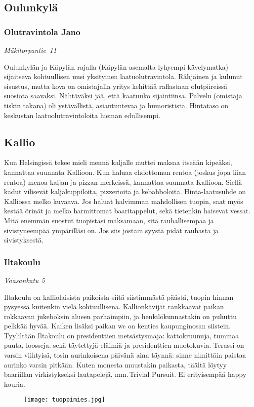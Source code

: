 \documentclass[../ala_hataile.tex]{subfiles}
\begin{document}
\subsection*{Oulunkylä}
\subsubsection*{Olutravintola Jano}
\textit{Mäkitorpantie~11}

Oulunkylän ja Käpylän rajalla (Käpylän
asemalta lyhyempi kävelymatka) sijaitseva
kohtuullisen uusi yksityinen laatuolutravintola.
Rähjäinen ja kulunut sisustus,
mutta kova on omistajalla yritys kehittää
raflastaan olutpiireissä suosiota saavaksi.
Nähtäväksi jää, että kaatuuko sijaintiinsa.
Palvelu (omistaja tiskin takana) oli ystävällistä,
asiantuntevaa ja humoristista. Hintataso
on keskustan laatuolutravintoloita hieman
edullisempi.
\subsection*{Kallio}
Kun Helsingissä tekee mieli mennä kaljalle
muttei maksaa itseään kipeäksi, kannattaa
suunnata Kallioon. Kun haluaa ehdottoman
rentoa (joskus jopa liian rentoa)
menoa kaljan ja pizzan merkeissä, kannattaa suunnata Kallioon. Siellä kadut vilisevät
kaljakuppiloita, pizzerioita ja kebabboloita.
Hinta-laatusuhde on Kalliossa melko
kuvaava. Jos haluat halvimman mahdollisen
tuopin, saat myös kestää örinät ja melko
harmittomat baaritappelut, sekä tietenkin
haisevat vessat. Mitä enemmän suostut
tuopistasi maksamaan, sitä rauhallisempaa
ja sivistyneempää ympärilläsi on. Jos siis
jostain syystä pidät rauhasta ja sivistyksestä.
\subsubsection*{Iltakoulu}
\textit{Vaasankatu 5}

Iltakoulu on kalliolaisista paikoista siitä
siistimmästä päästä, tuopin hinnan pysyessä
kuitenkin vielä kohtuullisena. Kallionkävijät
rankkaavat paikan rokkaavan
jukeboksin alueen parhaimpiin, ja henkilökunnastakin
on puhuttu pelkkää hyvää. Kaiken lisäksi paikan wc on kenties kaupunginosan
siistein. Tyyliltään Iltakoulu
on presidenttien metsästysmaja: kattokruunuja,
tummaa puuta, loosseja, sekä täytettyjä
eläimiä ja presidenttien muotokuvia. Terassi
on varsin viihtyisä, tosin aurinkoisena
päivänä aina täynnä: sinne nimittäin paistaa
aurinko varsin pitkään. Kuten monesta
muustakin paikasta, täältä löytyy baariillan
virkistykseksi
lautapelejä, mm.\,Trivial Pursuit. Ei erityisempää happy houria.
\begin{figure}[h!]
	\centering
	\texttt{[image: tuoppimies.jpg]}
\end{figure}
\end{document}
